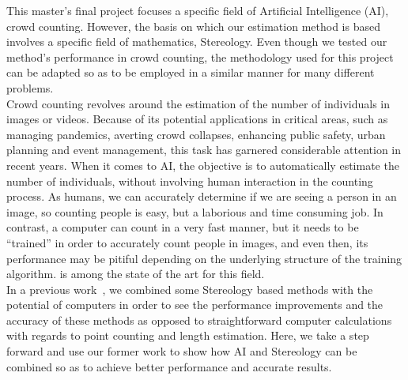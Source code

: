 This master's final project focuses a specific field of Artificial Intelligence (AI), crowd counting. However, the basis on which our estimation method is based involves a specific field of mathematics, Stereology. Even though we tested our method's performance in crowd counting, the methodology used for this project can be adapted so as to be employed in a similar manner for many different problems.\\

Crowd counting revolves around the estimation of the number of individuals in images or videos. Because of its potential applications in critical areas, such as managing pandemics, averting crowd collapses, enhancing public safety, urban planning and event management, this task has garnered considerable attention in recent years. When it comes to AI, the objective is to automatically estimate the number of individuals, without involving human interaction in the counting process. As humans, we can accurately determine if we are seeing a person in an image, so counting people is easy, but a laborious and time consuming job. 
In contrast, a computer can count in a very fast manner, but it needs to be ``trained'' in order to accurately count people in images, and even then, its performance may be pitiful depending on the underlying structure of the training algorithm. \cite{CLIP} is among the state of the art for this field. \\

In a previous work~\citep{TFG}, we combined some Stereology based methods with the potential of computers in order to see the performance improvements and the accuracy of these methods as opposed to straightforward computer calculations with regards to point counting and length estimation. Here, we take a step forward and use our former work to show how AI and Stereology can be combined so as to achieve better performance and accurate results.

